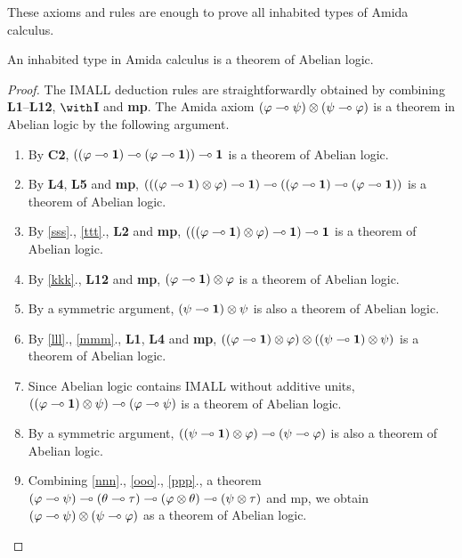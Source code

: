 These axioms and rules are enough to prove all inhabited types of
Amida calculus.
\begin{theorem}
 \label{sound-to-abelian}
 An inhabited type in Amida calculus is a theorem of Abelian logic.
\end{theorem}
\begin{proof}
 The IMALL deduction rules are straightforwardly obtained by combining
 \textbf{L1}--\textbf{L12}, $\with$\textbf{I} and \textbf{mp}.
 The Amida axiom $(\varphi\multimap\psi)\otimes (\psi\multimap\varphi)$ is a theorem
 in Abelian logic by the following argument.
 \begin{enumerate}
  \item \label{sss} By \textbf{C2},
	$((\varphi\multimap\mathbf{1})\multimap(\varphi\multimap\mathbf{1}))\multimap\mathbf{1}$ is a
	theorem of Abelian logic.
  \item \label{ttt} By \textbf{L4}, \textbf{L5} and \textbf{mp},
	$(((\varphi\multimap\mathbf{1})\otimes\varphi)\multimap\mathbf{1}) \multimap
	((\varphi\multimap\mathbf{1})\multimap(\varphi\multimap\mathbf{1}))$ is a theorem of Abelian
	logic.
  \item \label{kkk} By \ref{sss}., \ref{ttt}., \textbf{L2} and \textbf{mp},
	$ (((\varphi\multimap\mathbf{1})\otimes\varphi)\multimap\mathbf{1}) \multimap \mathbf{1} $ is a
	theorem of Abelian logic.
  \item \label{lll} By \ref{kkk}., \textbf{L12} and \textbf{mp},
	$(\varphi\multimap \mathbf{1})\otimes\varphi$ is a theorem of Abelian logic.
  \item \label{mmm} By a symmetric argument, $(\psi\multimap\mathbf{1})\otimes\psi$ is also a
	theorem of Abelian logic.
  \item \label{nnn} By \ref{lll}., \ref{mmm}., \textbf{L1}, \textbf{L4}
	and \textbf{mp}, $((\varphi\multimap
	\mathbf{1})\otimes\varphi)\otimes((\psi\multimap\mathbf{1})\otimes\psi)$ is a
	theorem of Abelian logic.
  \item \label{ooo} Since Abelian logic contains IMALL without additive units,
	$((\varphi\multimap\mathbf{1})\otimes\psi)\multimap(\varphi\multimap\psi)$ is a theorem
	of Abelian logic.
  \item \label{ppp} By a symmetric argument,
	$((\psi\multimap\mathbf{1})\otimes\varphi)\multimap(\psi\multimap\varphi)$ is also a
	theorem of Abelian logic.
  \item Combining \ref{nnn}., \ref{ooo}., \ref{ppp}., a theorem
	$(\varphi\multimap\psi)\multimap(\theta\multimap\tau)\multimap(\varphi\otimes\theta)\multimap(\psi\otimes\tau)$
	and
	mp, we obtain $(\varphi\multimap\psi)\otimes(\psi\multimap\varphi)$ as a
	theorem of Abelian
	logic.
 \end{enumerate}
\end{proof}

